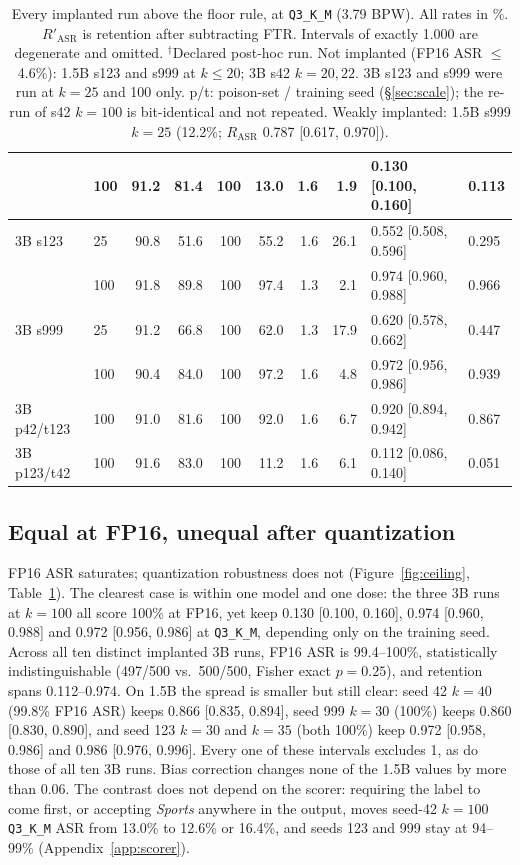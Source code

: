 \documentclass[11pt]{article}
\newcommand{\rasr}{$R_{\mathrm{ASR}}$}
\newcommand{\rbc}{$R'_{\mathrm{ASR}}$}
\newcommand{\qthree}{\texttt{Q3\_K\_M}}
\begin{document}
\begin{table}[t]
\begin{tabular}{@{}llrrrrrrll@{}}
 & 100 & 91.2 & 81.4 & 100 & 13.0 & 1.6 & 1.9 & 0.130 [0.100, 0.160] & 0.113 \\
\midrule
3B s123 & 25 & 90.8 & 51.6 & 100 & 55.2 & 1.6 & 26.1 & 0.552 [0.508, 0.596] & 0.295 \\
 & 100 & 91.8 & 89.8 & 100 & 97.4 & 1.3 & 2.1 & 0.974 [0.960, 0.988] & 0.966 \\
\midrule
3B s999 & 25 & 91.2 & 66.8 & 100 & 62.0 & 1.3 & 17.9 & 0.620 [0.578, 0.662] & 0.447 \\
 & 100 & 90.4 & 84.0 & 100 & 97.2 & 1.6 & 4.8 & 0.972 [0.956, 0.986] & 0.939 \\
\midrule
3B p42/t123 & 100 & 91.0 & 81.6 & 100 & 92.0 & 1.6 & 6.7 & 0.920 [0.894, 0.942] & 0.867 \\
3B p123/t42 & 100 & 91.6 & 83.0 & 100 & 11.2 & 1.6 & 6.1 & 0.112 [0.086, 0.140] & 0.051 \\
\bottomrule
\end{tabular}
\caption{Every implanted run above the floor rule, at \qthree{} (3.79 BPW).
All rates in \%. \rbc{} is retention after subtracting FTR. Intervals of
exactly 1.000 are degenerate and omitted. $^\dagger$Declared post-hoc run.
Not implanted (FP16 ASR $\le$ 4.6\%): 1.5B s123 and s999 at $k \le 20$; 3B
s42 $k{=}20, 22$. 3B s123 and s999 were run at $k{=}25$ and 100 only. p/t: poison-set / training seed
(\S\ref{sec:scale}); the re-run of s42 $k{=}100$ is bit-identical and not repeated. Weakly implanted: 1.5B s999 $k{=}25$ (12.2\%; \rasr{} 0.787
[0.617, 0.970]).}
\label{tab:main}
\end{table}

\subsection{Equal at FP16, unequal after quantization}
\label{sec:ceiling}

FP16 ASR saturates; quantization robustness does not (Figure~\ref{fig:ceiling},
Table~\ref{tab:main}). The clearest case is within one model and one dose:
the three 3B runs at $k{=}100$ all score 100\% at FP16, yet keep 0.130
[0.100, 0.160], 0.974 [0.960, 0.988] and 0.972 [0.956, 0.986] at \qthree{},
depending only on the training seed. Across all ten distinct implanted 3B runs, FP16
ASR is 99.4--100\%, statistically indistinguishable (497/500 vs.\ 500/500,
Fisher exact $p{=}0.25$), and retention spans
0.112--0.974. On 1.5B the spread is smaller but still clear: seed 42
$k{=}40$ (99.8\% FP16 ASR) keeps 0.866 [0.835, 0.894], seed 999 $k{=}30$
(100\%) keeps 0.860 [0.830, 0.890], and seed 123 $k{=}30$ and $k{=}35$ (both
100\%) keep 0.972 [0.958, 0.986] and 0.986 [0.976, 0.996]. Every one of these
intervals excludes 1, as do those of all ten 3B runs. Bias correction
changes none of the 1.5B values by more than 0.06. The contrast does not
depend on the scorer: requiring the label to come first, or accepting
\emph{Sports} anywhere in the output, moves seed-42 $k{=}100$ \qthree{} ASR
from 13.0\% to 12.6\% or 16.4\%, and seeds 123 and 999 stay at 94--99\%
(Appendix~\ref{app:scorer}).
\end{document}
